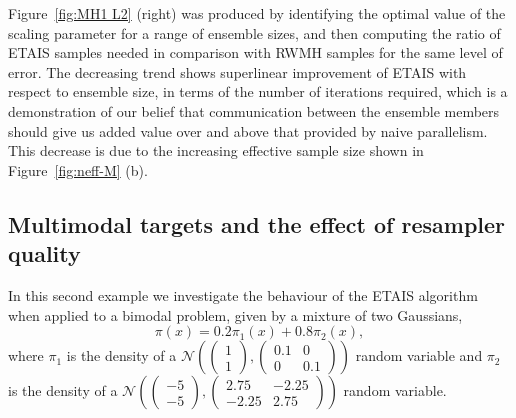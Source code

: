 \documentclass[final]{siamltex}
\newcommand{\revised}{}
\begin{document}
Figure~\ref{fig:MH1 L2} (right) was produced by identifying the
optimal value of the scaling parameter for a range of ensemble sizes,
and then computing the ratio of ETAIS samples needed in comparison
with RWMH samples for the same level of error. The decreasing trend shows superlinear improvement of
ETAIS with respect to ensemble size, in terms of the number of
iterations required, which is a demonstration of our belief that
communication between the ensemble members should give us added value over and above that
provided by naive parallelism. This decrease is due to the increasing
effective sample size shown in Figure~\ref{fig:neff-M} (b).

\subsection{Multimodal targets and the effect of resampler quality}
\label{sec:bimodal}
{\revised
In this second example we investigate the behaviour of the ETAIS
algorithm when applied to a bimodal problem, given by a mixture of two
Gaussians,
\[\pi(x) = 0.2\pi_1(x) + 0.8\pi_2(x),\]
where $\pi_1$ is the density of a $\mathcal{N}\left (\begin{pmatrix} 1
    \\ 1 \end{pmatrix}, \begin{pmatrix} 0.1 & 0 
    \\ 0 & 0.1 \end{pmatrix} \right )$ random variable and $\pi_2$ is the
  density of a $\mathcal{N}\left (\begin{pmatrix} -5
    \\ -5 \end{pmatrix}, \begin{pmatrix} 2.75 & -2.25 
    \\ -2.25 & 2.75 \end{pmatrix} \right )$ random variable.}
\end{document}
